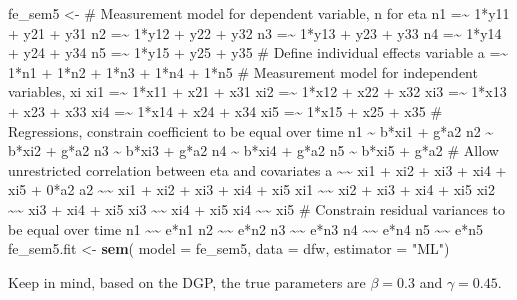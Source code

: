 \documentclass[]{interact}
\theoremstyle{plain}%
\theoremstyle{definition}
\theoremstyle{remark}
\newenvironment{Shaded}{\begin{snugshade}}{\end{snugshade}}
\newcommand{\DataTypeTok}[1]{\textcolor[rgb]{0.13,0.29,0.53}{#1}}
\newcommand{\KeywordTok}[1]{\textcolor[rgb]{0.13,0.29,0.53}{\textbf{#1}}}
\newcommand{\NormalTok}[1]{#1}
\newcommand{\StringTok}[1]{\textcolor[rgb]{0.31,0.60,0.02}{#1}}
\begin{document}
\begin{Shaded}
\begin{Highlighting}[]
\NormalTok{fe\_sem5 \textless{}{-}}\StringTok{ \textquotesingle{}}
\StringTok{\# Measurement model for dependent variable, n for eta}
\StringTok{n1 =\textasciitilde{} 1*y11 + y21 + y31}
\StringTok{n2 =\textasciitilde{} 1*y12 + y22 + y32}
\StringTok{n3 =\textasciitilde{} 1*y13 + y23 + y33}
\StringTok{n4 =\textasciitilde{} 1*y14 + y24 + y34}
\StringTok{n5 =\textasciitilde{} 1*y15 + y25 + y35}
\StringTok{\# Define individual effects variable }
\StringTok{a =\textasciitilde{} 1*n1 + 1*n2 + 1*n3 + 1*n4 + 1*n5}
\StringTok{\# Measurement model for independent variables, xi }
\StringTok{xi1 =\textasciitilde{} 1*x11 + x21 + x31 }
\StringTok{xi2 =\textasciitilde{} 1*x12 + x22 + x32}
\StringTok{xi3 =\textasciitilde{} 1*x13 + x23 + x33}
\StringTok{xi4 =\textasciitilde{} 1*x14 + x24 + x34}
\StringTok{xi5 =\textasciitilde{} 1*x15 + x25 + x35}
\StringTok{\# Regressions, constrain coefficient to be equal over time}
\StringTok{n1 \textasciitilde{} b*xi1 + g*a2}
\StringTok{n2 \textasciitilde{} b*xi2 + g*a2}
\StringTok{n3 \textasciitilde{} b*xi3 + g*a2}
\StringTok{n4 \textasciitilde{} b*xi4 + g*a2}
\StringTok{n5 \textasciitilde{} b*xi5 + g*a2}
\StringTok{\# Allow unrestricted correlation between eta and covariates}
\StringTok{a \textasciitilde{}\textasciitilde{} xi1 + xi2 + xi3 + xi4 + xi5 + 0*a2}
\StringTok{a2 \textasciitilde{}\textasciitilde{} xi1 + xi2 + xi3 + xi4 + xi5}
\StringTok{xi1 \textasciitilde{}\textasciitilde{} xi2 + xi3 + xi4 + xi5}
\StringTok{xi2 \textasciitilde{}\textasciitilde{} xi3 + xi4 + xi5}
\StringTok{xi3 \textasciitilde{}\textasciitilde{} xi4 + xi5}
\StringTok{xi4 \textasciitilde{}\textasciitilde{} xi5}
\StringTok{\# Constrain residual variances to be equal over time}
\StringTok{n1 \textasciitilde{}\textasciitilde{} e*n1}
\StringTok{n2 \textasciitilde{}\textasciitilde{} e*n2}
\StringTok{n3 \textasciitilde{}\textasciitilde{} e*n3}
\StringTok{n4 \textasciitilde{}\textasciitilde{} e*n4}
\StringTok{n5 \textasciitilde{}\textasciitilde{} e*n5}
\StringTok{\textquotesingle{}}
\NormalTok{fe\_sem5.fit \textless{}{-}}\StringTok{ }\KeywordTok{sem}\NormalTok{( }\DataTypeTok{model =}\NormalTok{ fe\_sem5, }
                    \DataTypeTok{data =}\NormalTok{ dfw, }
                    \DataTypeTok{estimator =} \StringTok{"ML"}\NormalTok{)}
\end{Highlighting}
\end{Shaded}

\doublespacing

Keep in mind, based on the DGP, the true parameters are \(\beta = 0.3\)
and \(\gamma = 0.45\).
\end{document}
